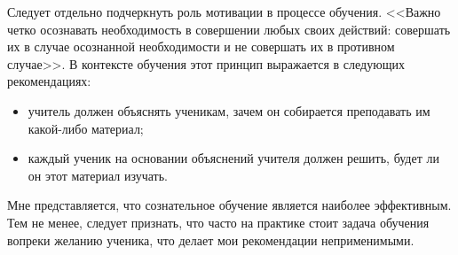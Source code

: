 Следует отдельно подчеркнуть роль мотивации в процессе обучения.
<<Важно четко осознавать необходимость в совершении любых своих действий:
совершать их в случае осознанной необходимости и не совершать их в противном случае>>.
В контексте обучения этот принцип выражается в следующих рекомендациях:
\begin{itemize}
\item учитель должен объяснять ученикам,
  зачем он собирается преподавать им какой-либо материал;
\item каждый ученик на основании объяснений учителя должен решить,
  будет ли он этот материал изучать.
\end{itemize}

Мне представляется, что сознательное обучение является наиболее эффективным.
Тем не менее, следует признать, что часто на практике стоит задача обучения вопреки
желанию ученика, что делает мои рекомендации неприменимыми.
